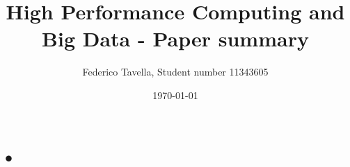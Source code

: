 \documentclass[a4paper]{article}
\title{High Performance Computing and Big Data - Paper summary}
\author{Federico Tavella, Student number 11343605}
\date{\today}
\begin{document}
\maketitle

\section{•}
\end{document}
